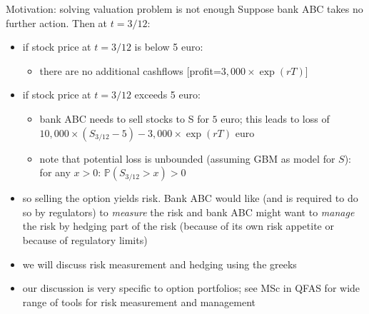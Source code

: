\documentclass[pdf, handout]{beamer}
\begin{document}
\begin{frame}{Motivation: solving valuation problem is not enough}
Suppose bank ABC takes no further action. Then at $t=3/12$:
\begin{itemize}
\item if stock price at $t=3/12$ is below 5 euro:
\begin{itemize}
\item there are no additional cashflows [profit=$3,000\times\exp(rT)$] 
\end{itemize}
\item if stock price at $t=3/12$ exceeds 5 euro:
\begin{itemize}
\item bank ABC needs to sell stocks to S for $5$ euro; this leads to loss
of $10,000 \times (S_{3/12} -5) - 3,000\times\exp(rT)$ euro
\item note that potential loss is unbounded (assuming GBM as model for $S$):  for any $x>0$:  $\mathbb{P}(S_{3/12} > x)>0$
\end{itemize}
\item so selling the option yields risk. Bank ABC would like (and is required to do so by regulators) to \emph{measure}  the risk
and bank ABC might want to \emph{manage} the risk by hedging part of the risk (because of its own risk appetite or because of regulatory limits)
\item we will discuss risk measurement and hedging using the greeks
\item our discussion is very specific to option portfolios; see MSc in QFAS for wide range of tools for risk measurement and management
\end{itemize}
\end{frame}

%
%
\end{document}
